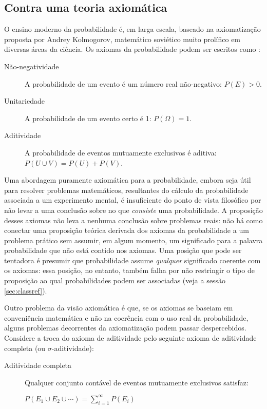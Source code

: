 \subsection{Contra uma teoria axiomática}\label{sec:axiomatica}
O ensino moderno da probabilidade é, em larga escala, baseado na axiomatização proposta por Andrey Kolmogorov, matemático
soviético muito prolífico em diversas áreas da ciência. Os axiomas da probabilidade podem ser escritos como \cite{Morettin09}:

\begin{description}
	\item[Não-negatividade] A probabilidade de um evento é um número real não-negativo: $P(E) > 0$.
	\item[Unitariedade] A probabilidade de um evento certo é 1: $P(\Omega) = 1$.
	\item[Aditividade] A probabilidade de eventos mutuamente exclusivos é aditiva: $P(U \cup V) = P(U)+P(V)$.
\end{description}

Uma abordagem puramente axiomática para a probabilidade, embora seja útil para resolver problemas matemáticos, resultantes do
cálculo da probabilidade associada a um experimento mental, é insuficiente do ponto de vista filosófico por não 
levar a uma conclusão sobre no que {\em consiste} uma probabilidade. A proposição desses axiomas não leva a nenhuma conclusão 
sobre problemas reais: não há como conectar uma proposição teórica derivada dos axiomas da probabilidade a um problema
prático sem assumir, em algum momento, um significado para a palavra probabilidade que não está contido nos axiomas. Uma posição
que pode ser tentadora é presumir que probabilidade assume {\em qualquer} significado coerente com os axiomas: essa posição,
no entanto, também falha por não restringir o tipo de proposição ao qual probabilidades podem ser associadas (veja a sessão
\ref{sec:classref}). 

Outro problema da visão axiomática é que, se os axiomas se baseiam em conveniência matemática e não na coerência com o uso 
real da probabilidade, alguns problemas decorrentes da axiomatização podem passar despercebidos. Considere a troca do axioma
de aditividade pelo seguinte axioma de aditividade completa (ou $\sigma$-aditividade):

\begin{description}
	\item[Aditividade completa] Qualquer conjunto contável de eventos mutuamente exclusivos satisfaz:

		$P(E_1 \cup E_2 \cup \cdots) = \sum_{i=1}^\infty P(E_i)$
\end{description}

